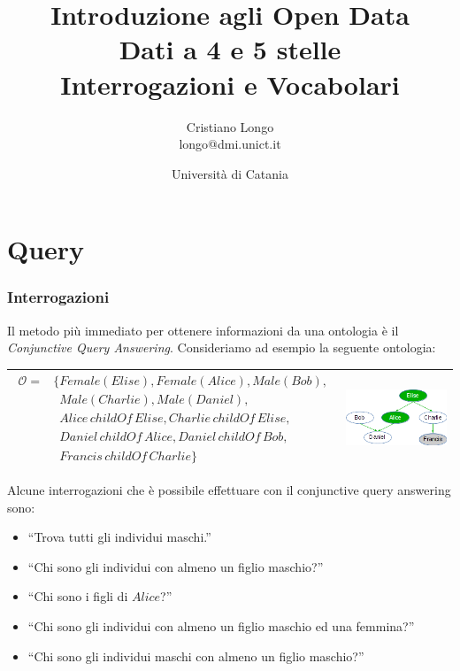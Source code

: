 \documentclass[8pt]{beamer}
\title{Introduzione agli Open Data\\
Dati a 4 e 5 stelle\\
Interrogazioni e Vocabolari}
\author{Cristiano Longo\\ 
{\small{longo@dmi.unict.it}}}
\date{Universit\`a di Catania}
\newcommand{\Ont}{\mathcal{O}}
\begin{document}
\maketitle
\setcounter{tocdepth}{1}

\section{Query}

\begin{frame}
\frametitle{Interrogazioni}

  Il metodo pi\`u immediato per ottenere informazioni da una ontologia \`e il 
  \emph{Conjunctive Query Answering}. Consideriamo ad esempio la seguente ontologia:

  \begin{tabular}{cc}
  \hline
  $\begin{array}{cl}
    \Ont  =  &  \{Female(Elise), Female(Alice), Male(Bob), \\
    &\phantom{\{}Male(Charlie), Male(Daniel), \\
    &\phantom{\{}Alice\,childOf\,Elise, Charlie\,childOf\,Elise, \\
    &\phantom{\{}Daniel\,childOf\,Alice, Daniel\,childOf\,Bob, \\
    &\phantom{\{}Francis\,childOf\,Charlie \}
  \end{array}$ & \includegraphics[width=120px]{family.png} \\
  \hline
  \end{tabular}

  Alcune interrogazioni che \`e possibile effettuare con il conjunctive query 
  answering sono:
  \begin{itemize}
    \item ``Trova tutti gli individui maschi.''
    \item ``Chi sono gli individui con almeno un figlio maschio?''
    \item ``Chi sono i figli di $Alice$?''
    \item ``Chi sono gli individui con almeno un figlio maschio ed una femmina?''
    \item ``Chi sono gli individui maschi con almeno un figlio maschio?''
  \end{itemize}
\end{frame}
\end{document}
